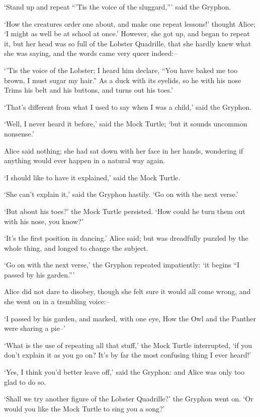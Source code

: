 \documentclass[statementpaper,twoside,openany]{memoir}
\begin{document}
`Stand up and repeat ``'Tis the voice of the sluggard,''' said the Gryphon.

`How the creatures order one about, and make one repeat lessons!' thought Alice; `I might as well be at school at once.' However, she got up, and began to repeat it, but her head was so full of the Lobster Quadrille, that she hardly knew what she was saying, and the words came very queer indeed:--

`'Tis the voice of the Lobster; I heard him declare, ``You have baked me too brown, I must sugar my hair.'' As a duck with its eyelids, so he with his nose Trims his belt and his buttons, and turns out his toes.'

`That's different from what I used to say when I was a child,' said the Gryphon.

`Well, I never heard it before,' said the Mock Turtle; `but it sounds uncommon nonsense.'

Alice said nothing; she had sat down with her face in her hands, wondering if anything would ever happen in a natural way again.

`I should like to have it explained,' said the Mock Turtle.

`She can't explain it,' said the Gryphon hastily. `Go on with the next verse.'

`But about his toes?' the Mock Turtle persisted. `How could he turn them out with his nose, you know?'

`It's the first position in dancing.' Alice said; but was dreadfully puzzled by the whole thing, and longed to change the subject.

`Go on with the next verse,' the Gryphon repeated impatiently: `it begins ``I passed by his garden.'''

Alice did not dare to disobey, though she felt sure it would all come wrong, and she went on in a trembling voice:--

`I passed by his garden, and marked, with one eye, How the Owl and the Panther were sharing a pie--'

`What is the use of repeating all that stuff,' the Mock Turtle interrupted, `if you don't explain it as you go on? It's by far the most confusing thing I ever heard!'

`Yes, I think you'd better leave off,' said the Gryphon: and Alice was only too glad to do so.

`Shall we try another figure of the Lobster Quadrille?' the Gryphon went on. `Or would you like the Mock Turtle to sing you a song?'
\end{document}
